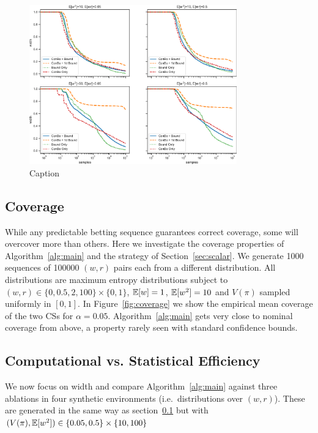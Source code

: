 \begin{figure}
    \centering
    \includegraphics[width=0.8\textwidth]{width}
    \caption{Caption}
    \label{fig:width}
\end{figure}

\subsection{Coverage} \label{sec:coverage}
While any predictable betting sequence
guarantees correct coverage, some will overcover more than
others. Here we investigate the coverage properties of 
Algorithm~\ref{alg:main} and the strategy of Section~\ref{sec:scalar}.
We generate 1000 sequences of 100000 $(w,r)$ pairs each from a different
distribution. All distributions are maximum entropy distributions subject to
$(w,r) \in \{0, 0.5, 2, 100\} \times \{0,1\}$, $\mathbb{E}[w]=1$, $\mathbb{E}[w^2]=10$
and $V(\pi)$ sampled uniformly in $[0,1]$. In Figure~\ref{fig:coverage} we show
the empirical mean coverage of the two CSs for $\alpha=0.05$. 
Algorithm~\ref{alg:main} gets very close to nominal coverage from above,
a property rarely seen with standard confidence bounds.

\subsection{Computational vs. Statistical Efficiency}
We now focus on width and compare Algorithm~\ref{alg:main} against 
three ablations in four synthetic
environments (i.e.\ distributions over $(w,r)$). These
are generated in the same way as section~\ref{sec:coverage} but
with $(V(\pi),\mathbb{E}[w^2]) \in \{0.05, 0.5\} \times \{10, 100\}$

